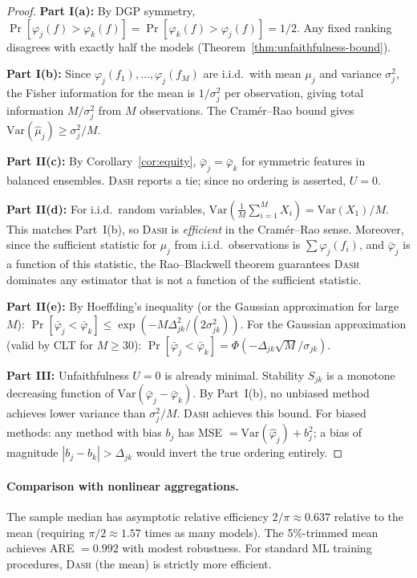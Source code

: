 \documentclass{jmlr}
\newcommand{\Var}{\mathrm{Var}}
\newcommand{\DASH}{\textsc{Dash}}
\begin{document}
\begin{proof}
\textbf{Part I(a):} By DGP symmetry, $\Pr[\varphi_j(f) > \varphi_k(f)] = \Pr[\varphi_k(f) > \varphi_j(f)] = 1/2$. Any fixed ranking disagrees with exactly half the models (Theorem~\ref{thm:unfaithfulness-bound}).

\textbf{Part I(b):} Since $\varphi_j(f_1), \ldots, \varphi_j(f_M)$ are i.i.d.\ with mean $\mu_j$ and variance $\sigma_j^2$, the Fisher information for the mean is $1/\sigma_j^2$ per observation, giving total information $M/\sigma_j^2$ from $M$ observations. The Cram\'er--Rao bound gives $\Var(\hat\mu_j) \geq \sigma_j^2/M$.

\textbf{Part II(c):} By Corollary~\ref{cor:equity}, $\bar\varphi_j = \bar\varphi_k$ for symmetric features in balanced ensembles. \DASH{} reports a tie; since no ordering is asserted, $U = 0$.

\textbf{Part II(d):} For i.i.d.\ random variables, $\Var(\frac{1}{M}\sum_{i=1}^M X_i) = \Var(X_1)/M$. This matches Part~I(b), so \DASH{} is \emph{efficient} in the Cram\'er--Rao sense. Moreover, since the sufficient statistic for $\mu_j$ from i.i.d.\ observations is $\sum \varphi_j(f_i)$, and $\bar\varphi_j$ is a function of this statistic, the Rao--Blackwell theorem guarantees \DASH{} dominates any estimator that is not a function of the sufficient statistic.

\textbf{Part II(e):} By Hoeffding's inequality (or the Gaussian approximation for large $M$): $\Pr[\bar\varphi_j < \bar\varphi_k] \leq \exp(-M\Delta_{jk}^2/(2\sigma_{jk}^2))$. For the Gaussian approximation (valid by CLT for $M \geq 30$): $\Pr[\bar\varphi_j < \bar\varphi_k] = \Phi(-\Delta_{jk}\sqrt{M}/\sigma_{jk})$.

\textbf{Part III:} Unfaithfulness $U = 0$ is already minimal. Stability $S_{jk}$ is a monotone decreasing function of $\Var(\bar\varphi_j - \bar\varphi_k)$. By Part~I(b), no unbiased method achieves lower variance than $\sigma_j^2/M$. \DASH{} achieves this bound. For biased methods: any method with bias $b_j$ has MSE $= \Var(\hat\varphi_j) + b_j^2$; a bias of magnitude $|b_j - b_k| > \Delta_{jk}$ would invert the true ordering entirely.
\end{proof}

\paragraph{Comparison with nonlinear aggregations.}
The sample median has asymptotic relative efficiency $2/\pi \approx 0.637$ relative to the mean (requiring $\pi/2 \approx 1.57$ times as many models). The 5\%-trimmed mean achieves ARE $= 0.992$ with modest robustness. For standard ML training procedures, \DASH{} (the mean) is strictly more efficient.
\end{document}

